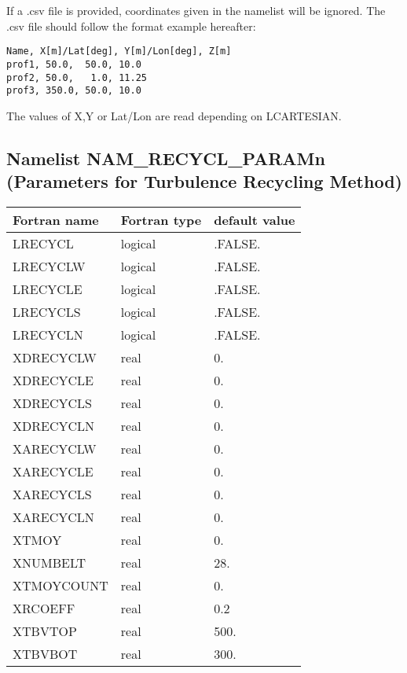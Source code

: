 If a .csv file is provided, coordinates given in the namelist will be ignored. The .csv file should follow the format example hereafter:
\begin{verbatim}
Name, X[m]/Lat[deg], Y[m]/Lon[deg], Z[m]
prof1, 50.0,  50.0, 10.0
prof2, 50.0,   1.0, 11.25
prof3, 350.0, 50.0, 10.0
\end{verbatim}
The values of X,Y or Lat/Lon are read depending on LCARTESIAN.

\subsection{Namelist NAM\_RECYCL\_PARAMn (Parameters for Turbulence Recycling Method)}
\begin{longtable} {|p{}|p{}|p{}|}
\hline
Fortran name &  Fortran type & default value \\
\hline 
\endhead
\hline
\endfoot
LRECYCL              & logical       & .FALSE.       \\
LRECYCLW             & logical       & .FALSE.       \\
LRECYCLE             & logical       & .FALSE.       \\
LRECYCLS             & logical       & .FALSE.       \\
LRECYCLN             & logical       & .FALSE.       \\
XDRECYCLW            & real          & 0.            \\
XDRECYCLE            & real          & 0.            \\
XDRECYCLS            & real          & 0.            \\
XDRECYCLN            & real          & 0.            \\
XARECYCLW            & real          & 0.            \\
XARECYCLE            & real          & 0.            \\
XARECYCLS            & real          & 0.            \\
XARECYCLN            & real          & 0.            \\
XTMOY                & real          & 0.            \\
XNUMBELT             & real          & 28.           \\
XTMOYCOUNT           & real          & 0.            \\
XRCOEFF              & real          & 0.2           \\
XTBVTOP              & real          & 500.          \\
XTBVBOT              & real          & 300.          \\
\end{longtable}

